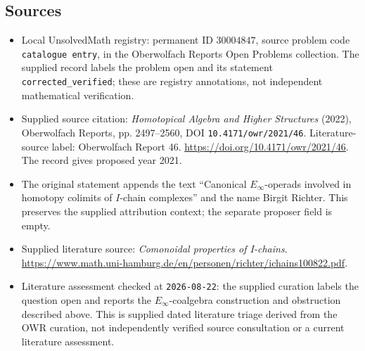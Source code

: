 \documentclass[11pt]{article}
\begin{document}
\subsection{Sources}
\begin{itemize}
\item Local UnsolvedMath registry: permanent ID \(30004847\), source problem code \texttt{catalogue entry}, in the Oberwolfach Reports Open Problems collection. The supplied record labels the problem open and its statement \texttt{corrected\_verified}; these are registry annotations, not independent mathematical verification.
\item Supplied source citation: \emph{Homotopical Algebra and Higher Structures} (2022), Oberwolfach Reports, pp. 2497--2560, DOI \texttt{10.4171/owr/2021/46}. Literature-source label: Oberwolfach Report 46. \url{https://doi.org/10.4171/owr/2021/46}. The record gives proposed year 2021.
\item The original statement appends the text ``Canonical \(E_\infty\)-operads involved in homotopy colimits of \(I\)-chain complexes'' and the name Birgit Richter. This preserves the supplied attribution context; the separate proposer field is empty.
\item Supplied literature source: \emph{Comonoidal properties of I-chains}. \url{https://www.math.uni-hamburg.de/en/personen/richter/ichains100822.pdf}.
\item Literature assessment checked at \texttt{2026-08-22}: the supplied curation labels the question open and reports the \(E_\infty\)-coalgebra construction and obstruction described above. This is supplied dated literature triage derived from the OWR curation, not independently verified source consultation or a current literature assessment.
\end{itemize}
\end{document}
